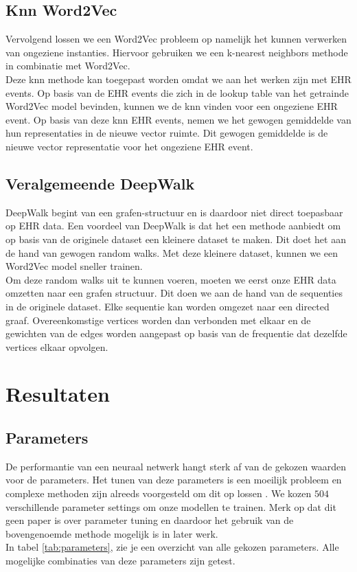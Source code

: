 \documentclass[11pt, final, journal, twoside, a4paper]{IEEEtran}
\begin{document}
\subsection{Knn Word2Vec}

Vervolgend lossen we een Word2Vec probleem op namelijk het kunnen verwerken van ongeziene instanties. Hiervoor gebruiken we een k-nearest neighbors methode \cite{knn:article} in combinatie met Word2Vec. \\

Deze knn methode kan toegepast worden omdat we aan het werken zijn met EHR events. Op basis van de EHR events die zich in de lookup table van het getrainde Word2Vec model bevinden, kunnen we de knn vinden voor een ongeziene EHR event. Op basis van deze knn EHR events, nemen we het gewogen gemiddelde van hun representaties in de nieuwe vector ruimte. Dit gewogen gemiddelde is de nieuwe vector representatie voor het ongeziene EHR event.

\subsection{Veralgemeende DeepWalk}

DeepWalk \cite{deepwalkMain:article} begint van een grafen-structuur en is daardoor niet direct toepasbaar op EHR data. Een voordeel van DeepWalk is dat het een methode aanbiedt om op basis van de originele dataset een kleinere dataset te maken. Dit doet het aan de hand van gewogen random walks. Met deze kleinere dataset, kunnen we een Word2Vec model sneller trainen. \\

Om deze random walks uit te kunnen voeren, moeten we eerst onze EHR data omzetten naar een grafen structuur. Dit doen we aan de hand van de sequenties in de originele dataset. Elke sequentie kan worden omgezet naar een directed graaf. Overeenkomstige vertices worden dan verbonden met elkaar en de gewichten van de edges worden aangepast op basis van de frequentie dat dezelfde vertices elkaar opvolgen.


\section{Resultaten}


\subsection{Parameters}


De performantie van een neuraal netwerk hangt sterk af van de gekozen waarden voor de parameters. Het tunen van deze parameters is een moeilijk probleem en complexe methoden zijn alreeds voorgesteld om dit op lossen \cite{tuning:article}. We kozen $504$ verschillende parameter settings om onze modellen te trainen. Merk op dat dit geen paper is over parameter tuning en daardoor het gebruik van de bovengenoemde methode mogelijk is in later werk. \\
In tabel \ref{tab:parameters}, zie je een overzicht van alle gekozen parameters. Alle mogelijke combinaties van deze parameters zijn getest. \\
\end{document}
